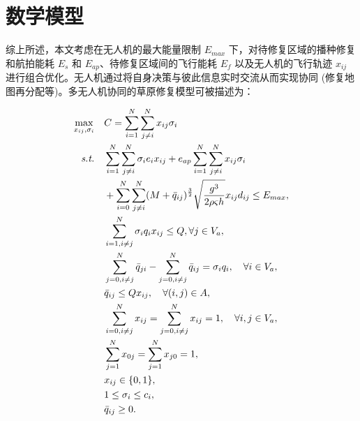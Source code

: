 \documentclass[AutoFakeBold]{LZUThesis}
\begin{document}
\section{数学模型}

综上所述，本文考虑在无人机的最大能量限制 $E_{max}$ 下，对待修复区域的播种修复和航拍能耗 $E_s$ 和 $E_{ap}$、待修复区域间的飞行能耗 $E_f$ 以及无人机的飞行轨迹 $x_{ij}$ 进行组合优化。无人机通过将自身决策与彼此信息实时交流从而实现协同 (修复地图再分配等)。多无人机协同的草原修复模型可被描述为：

\begin{subequations}\label{GRP}
	\begin{align}
		\max_{x_{ij},\sigma_i} \quad & C = \sum^N_{i = 1}\sum^N_{j \neq i} x_{ij}\sigma_i                                                                                                          \\
		\emph{s.t.} \quad            & \sum^N_{i = 1}\sum^N_{j \neq i}\sigma_i e_i x_{ij} + e_{ap}\sum^N_{i=1}\sum^N_{j \neq i} x_{ij}\sigma_i \nonumber                                           \\
		                             & + \sum^N_{i=0}\sum^N_{j \neq i} (M + \bar{q}_{ij})^{\frac{3}{2}}\sqrt{\frac{g^3}{2 \rho \varsigma h}} x_{ij} d_{ij} \leq E_{max}, \label{energy-constraint} \\
		                             & \sum^N_{i=1, i\neq j} \sigma_i q_i x_{ij} \leq Q, \forall j \in V_a,\label{total-load}                                                                      \\
		                             & \sum^N_{j=0, i\neq j}\bar{q}_{ji} -  \sum^N_{j=0, i\neq j}\bar{q}_{ij} = \sigma_i q_i, \label{carry-load} \quad \forall i \in V_a,                          \\
		                             & \bar{q}_{ij} \leq Q x_{ij}, \quad \forall (i,j) \in A, \label{load}                                                                                         \\
		                             & \sum^N_{i=0, i\neq j} x_{ij} = \sum^N_{j=0,i\neq j} x_{ij} = 1, \quad \forall i,j \in V_a, \label{enter-point}                                              \\
		                             & \sum^N_{j=1} x_{0j} = \sum^N_{j=1} x_{j0} = 1, \label{start-point}                                                                                          \\
		                             & x_{ij} \in \{0,1\}, \label{binary-variable}                                                                                                                 \\
		                             & 1 \leq \sigma_i \leq c_i, \label{area-constraint}                                                                                                           \\
		                             & \bar{q}_{ij} \geq 0. \label{flight-weight}
	\end{align}
\end{subequations}
\end{document}
